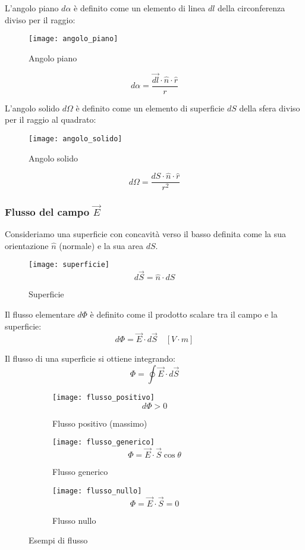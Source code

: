\documentclass[a4paper]{article}
\begin{document}
\begin{define}
  L'angolo piano \( d \alpha \) è definito come un elemento di linea \( dl \) della
  circonferenza diviso per il raggio:
  \begin{figure}[H]
    \centering
    \texttt{[image: angolo\_piano]}
    \caption{Angolo piano}
  \end{figure}
  \[
    d \alpha = \frac{\vec{dl} \cdot \hat{n} \cdot \hat{r}}{r}
  \] 
\end{define}
\begin{define}
  L'angolo solido \( d \Omega \) è definito come un elemento di superficie \( dS \) della
  sfera diviso per il raggio al quadrato:
  \begin{figure}[H]
    \centering
    \texttt{[image: angolo\_solido]}
    \caption{Angolo solido}
  \end{figure}
  \[
    d \Omega = \frac{dS \cdot \hat{n} \cdot \hat{r}}{r^2}
  \]
  
\end{define}

\subsubsection{Flusso del campo \texorpdfstring{\( \vec{E} \)}{E}}
Consideriamo una superficie con concavità verso il basso definita come la sua orientazione
\( \hat{n} \) (normale) e la sua area \( dS \).
\begin{figure}[H]
  \centering
  \texttt{[image: superficie]}
  \[
    d\vec{S} = \hat{n} \cdot dS
  \] 
  \caption{Superficie}
\end{figure}
\begin{definition}
  Il flusso elementare \( d \Phi \) è definito come il prodotto scalare tra il campo
  e la superficie:
  \[
    d \Phi = \vec{E} \cdot d \vec{S} \quad \left[ V \cdot m \right]
  \] 

  \vspace{1em}
  \noindent
  Il flusso di una superficie si ottiene integrando:
  \[
    \Phi = \oint \vec{E} \cdot d \vec{S}
  \] 
  \begin{figure}[H]
    \centering
    \begin{subfigure}{0.3\textwidth}
      \texttt{[image: flusso\_positivo]}
      \[
        d \Phi > 0
      \] 
      \caption{Flusso positivo (massimo)}
    \end{subfigure}
    \hfil
    \begin{subfigure}{0.3\textwidth}
      \texttt{[image: flusso\_generico]}
      \[
       \Phi = \vec{E} \cdot \vec{S} \cos \theta
      \] 
      \caption{Flusso generico}
    \end{subfigure}
    \hfil
    \begin{subfigure}{0.3\textwidth}
      \texttt{[image: flusso\_nullo]}
      \[
        \Phi = \vec{E} \cdot \vec{S} = 0
      \] 
      \caption{Flusso nullo}
    \end{subfigure}
    \caption{Esempi di flusso}
  \end{figure}
\end{definition}
\end{document}
